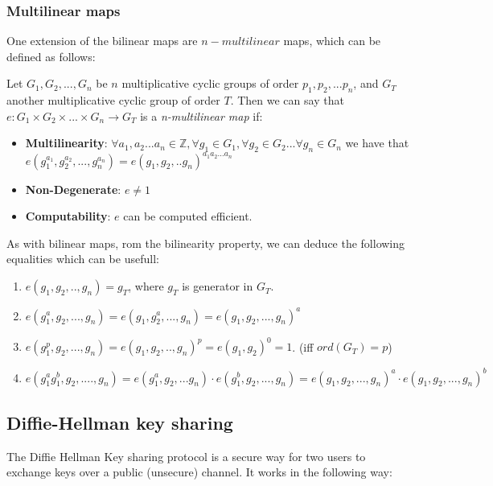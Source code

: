 \documentclass[a4paper, 12pt, oneside]{article}
\begin{document}
\subsubsection{Multilinear maps}
One extension of the bilinear maps are $n-multilinear$ maps, which can be defined as follows:


Let $G_1, G_2, ..., G_n$ be $n$ multiplicative cyclic groups of order $p_1, p_2, ...p_n$, and $G_T$ another multiplicative cyclic group of order $T$. Then we can say that $e : G_1 \times G_2 \times ... \times G_n \rightarrow G_T$ is a \textit{n-multilinear map} if:

\begin{itemize}

\item \textbf{Multilinearity}: $ \forall a_1, a_2... a_n \in \mathbb{Z}, \forall g_1 \in G_1, \forall g_2 \in G_2  ... \forall g_n \in G_n$ we have that $ e(g_1^{a_1}, g_2^{a_2}, ..., g_n^{a_n}) = e(g_1, g_2, ..g_n)^{a_1a_2...a_n}$
\item \textbf{Non-Degenerate}: $e \neq 1$
\item \textbf{Computability}: $e$ can be computed efficient.

\end{itemize}

As with bilinear maps, rom the bilinearity property, we can deduce the following equalities which can be usefull:
\begin{enumerate}


\item $e(g_1, g_2, .., g_n) = g_T$, where $g_T$ is generator in $G_T$.
\item $e(g_1^a, g_2,..., g_n) = e(g_1, g_2^a, ..., g_n) = e(g_1, g_2, ..., g_n)^a$
\item $e(g_1^p, g_2, ..., g_n) = e(g_1, g_2, .., g_n)^p = e(g_1, g_2)^0 = 1$. (iff $ord(G_T) = p$)

\item $e(g_1^ag_1^b, g_2, ...., g_n) = e(g_1^a, g_2, ...g_n)\cdot e(g_1^b, g_2, ..., g_n) = e(g_1, g_2, ...,g_n)^a \cdot e(g_1, g_2,...,g_n)^b$

\end{enumerate}


\subsection{Diffie-Hellman key sharing}

The Diffie Hellman Key sharing protocol is a secure way for two users to exchange keys over a public (unsecure) channel. It works in the following way:
\bigskip
\end{document}
